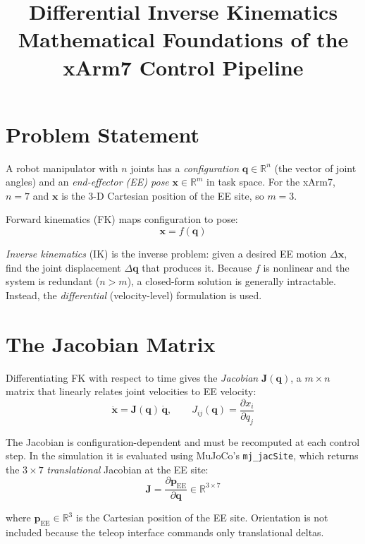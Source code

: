 \documentclass[11pt, a4paper]{article}
\title{\textbf{Differential Inverse Kinematics}\\
       \large Mathematical Foundations of the xArm7 Control Pipeline}
\author{}
\date{}
\begin{document}
\maketitle
\thispagestyle{empty}

\section{Problem Statement}

A robot manipulator with $n$ joints has a \emph{configuration} $\mathbf{q} \in \mathbb{R}^n$ (the vector of joint angles) and an \emph{end-effector (EE) pose} $\mathbf{x} \in \mathbb{R}^m$ in task space. For the xArm7, $n = 7$ and $\mathbf{x}$ is the 3-D Cartesian position of the EE site, so $m = 3$.

Forward kinematics (FK) maps configuration to pose:
\[
  \mathbf{x} = f(\mathbf{q})
\]

\emph{Inverse kinematics} (IK) is the inverse problem: given a desired EE motion $\Delta \mathbf{x}$, find the joint displacement $\Delta \mathbf{q}$ that produces it. Because $f$ is nonlinear and the system is redundant ($n > m$), a closed-form solution is generally intractable. Instead, the \emph{differential} (velocity-level) formulation is used.

\section{The Jacobian Matrix}

Differentiating FK with respect to time gives the \emph{Jacobian} $\mathbf{J}(\mathbf{q})$, a $m \times n$ matrix that linearly relates joint velocities to EE velocity:
\[
  \dot{\mathbf{x}} = \mathbf{J}(\mathbf{q})\,\dot{\mathbf{q}}, \qquad
  J_{ij}(\mathbf{q}) = \frac{\partial x_i}{\partial q_j}
\]

The Jacobian is configuration-dependent and must be recomputed at each control step. In the simulation it is evaluated using MuJoCo's \texttt{mj\_jacSite}, which returns the $3 \times 7$ \emph{translational} Jacobian at the EE site:
\[
  \mathbf{J} = \frac{\partial \mathbf{p}_{\text{EE}}}{\partial \mathbf{q}} \in \mathbb{R}^{3 \times 7}
\]

where $\mathbf{p}_{\text{EE}} \in \mathbb{R}^3$ is the Cartesian position of the EE site. Orientation is not included because the teleop interface commands only translational deltas.
\end{document}
